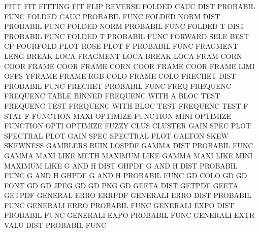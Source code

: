 FITT                                    FIT
FITTING                                 FIT
FLIP                                    REVERSE
FOLDED   CAUC DIST                      PROBABIL FUNC
FOLDED   CAUC                           PROBABIL FUNC
FOLDED   NORM DIST                      PROBABIL FUNC
FOLDED   NORM                           PROBABIL FUNC
FOLDED   T    DIST                      PROBABIL FUNC
FOLDED   T                              PROBABIL FUNC
FORWARD  SELE                           BEST     CP
FOURFOLD PLOT                           ROSE     PLOT
F                                       PROBABIL FUNC
FRAGMENT LENG                           BREAK    LOCA
FRAGMENT LOCA                           BREAK    LOCA
FRAM     CORN COOR                      FRAME    COOR
FRAME    CORN COOR                      FRAME    COOR
FRAME    LIMI OFFS                      YFRAME
FRAME    RGB  COLO                      FRAME    COLO
FRECHET  DIST                           PROBABIL FUNC
FRECHET                                 PROBABIL FUNC
FREQ                                    FREQUENC
FREQUENC TABLE                          BINNED
FREQUENC WITH A    BLOC TEST            FREQUENC TEST
FREQUENC WITH BLOC TEST                 FREQUENC TEST
F        STAT                           F
FUNCTION MAXI                           OPTIMIZE
FUNCTION MINI                           OPTIMIZE
FUNCTION OPTI                           OPTIMIZE
FUZZY    CLUS                           CLUSTER
GAIN     SPEC PLOT                      SPECTRAL PLOT
GAIN     SPEC                           SPECTRAL PLOT
GALTON   SKEW                           SKEWNESS
GAMBLERS RUIN                           LOSPDF
GAMMA    DIST                           PROBABIL FUNC
GAMMA    MAXI LIKE METH                 MAXIMUM  LIKE
GAMMA    MAXI LIKE MINI                 MAXIMUM  LIKE
G        AND  H    DIST                 GHPDF
G        AND  H    DIST                 PROBABIL FUNC
G        AND  H                         GHPDF
G        AND  H                         PROBABIL FUNC
GD       COLO                           GD
GD       FONT                           GD
GD       JPEG                           GD
GD       PNG                            GD
GEETA    DIST                           GETPDF
GEETA                                   GETPDF
GENERAL  ERRO                           ERRPDF
GENERALI ERRO DIST                      PROBABIL FUNC
GENERALI ERRO                           PROBABIL FUNC
GENERALI EXPO DIST                      PROBABIL FUNC
GENERALI EXPO                           PROBABIL FUNC
GENERALI EXTR VALU DIST                 PROBABIL FUNC
